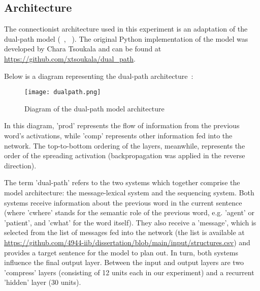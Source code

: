 \documentclass{article}
\begin{document}
\subsection{Architecture}
The connectionist architecture used in this experiment is an adaptation of the dual-path model (~\cite{elman1990}, ~\cite{chang2002}). The original Python implementation of the model was developed by Chara Tsoukala and can be found at \url{https://github.com/xtsoukala/dual_path}.

Below is a diagram representing the dual-path architecture~\cite{chang2002}:
\begin{figure}[H]
	\centering
	\texttt{[image: dualpath.png]}
	\caption{Diagram of the dual-path model architecture}
	\label{fig:fig4}
\end{figure}
In this diagram, 'prod' represents the flow of information from the previous word's activations, while 'comp' represents other information fed into the network. The top-to-bottom ordering of the layers, meanwhile, represents the order of the spreading activation (backpropagation was applied in the reverse direction).

The term 'dual-path' refers to the two systems which together comprise the model architecture: the message-lexical system and the sequencing system. Both systems receive information about the previous word in the current sentence (where 'cwhere' stands for the semantic role of the previous word, e.g. 'agent' or 'patient', and 'cwhat' for the word itself). They also receive a 'message', which is selected from the list of messages fed into the network (the list is available at \url{https://github.com/4944-iib/dissertation/blob/main/input/structures.csv}) and provides a target sentence for the model to plan out. In turn, both systems influence the final output layer. Between the input and output layers are two 'compress' layers (consisting of 12 units each in our experiment) and a recurrent 'hidden' layer (30 units).
\end{document}

